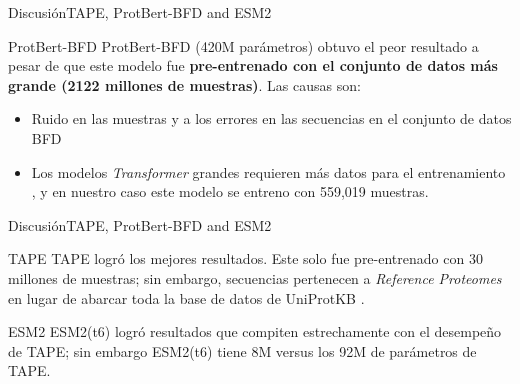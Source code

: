 \documentclass[10pt]{beamer}
\newcommand{\1}{
	\setbeamertemplate{background}{
		\texttt{[image: img/1]}
		\tikz[overlay] \fill[fill opacity=0.75,fill=white] (0,0) rectangle (-\paperwidth,\paperheight);
	}
}
\begin{document}
	


\begin{frame}{Discusión}{TAPE, ProtBert-BFD and ESM2}
	
	\begin{block}{ProtBert-BFD}
		ProtBert-BFD (420M parámetros) obtuvo el peor resultado a pesar de que este modelo fue \textbf{pre-entrenado con el conjunto de datos más grande (2122 millones de muestras)}. Las causas son: 
	\end{block}

	\begin{block}{}
		\begin{itemize}
			\item  Ruido en las muestras y a los errores en las secuencias en el conjunto de datos BFD \cite{elnaggar2021prottrans}
			\item Los modelos \textit{Transformer} grandes requieren más datos para el entrenamiento \cite{elnaggar2021prottrans}, y en nuestro caso este modelo se entreno con 559,019 muestras.
		\end{itemize}
	\end{block}
	
\end{frame}



\begin{frame}{Discusión}{TAPE, ProtBert-BFD and ESM2}
	
	\begin{block}{TAPE}
		TAPE logró los mejores resultados. Este solo fue pre-entrenado con 30 millones de muestras; sin embargo, secuencias pertenecen a \textit{Reference Proteomes} en lugar de abarcar toda la base de datos de UniProtKB \cite{finn2016pfam}. 
	\end{block}
	
	\begin{block}{ESM2}
		ESM2(t6) logró resultados que compiten estrechamente con el desempeño de TAPE; sin embargo ESM2(t6) tiene 8M versus los 92M de parámetros de TAPE.		
	\end{block}
\end{frame}
\end{document}
